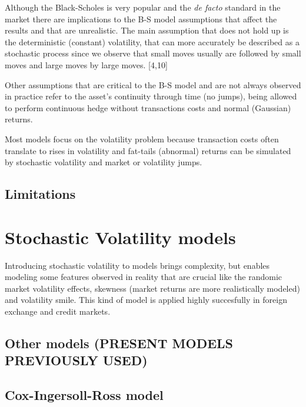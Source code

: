\documentclass[12pt,twoside]{reedthesis}
\theoremstyle{definition}
\theoremstyle{definition}
\theoremstyle{remark}
\begin{document}
  Although the Black-Scholes is very popular and the \emph{de facto}
  standard in the market there are implications to the B-S model
  assumptions that affect the results and that are unrealistic. The main
  assumption that does not hold up is the deterministic (constant)
  volatility, that can more accurately be described as a stochastic
  process since we observe that small moves usually are followed by small
  moves and large moves by large moves. {[}4,10{]}
  
  Other assumptions that are critical to the B-S model and are not always
  observed in practice refer to the asset's continuity through time (no
  jumps), being allowed to perform continuous hedge without transactions
  costs and normal (Gaussian) returns.
  
  Most models focus on the volatility problem because transaction costs
  often translate to rises in volatility and fat-tails (abnormal) returns
  can be simulated by stochastic volatility and market or volatility
  jumps.
  
  \subsection{Limitations}\label{limitations}
  
  \section{Stochastic Volatility
  models}\label{stochastic-volatility-models}
  
  Introducing stochastic volatility to models brings complexity, but
  enables modeling some features observed in reality that are crucial like
  the randomic market volatility effects, skewness (market returns are
  more realistically modeled) and volatility smile. This kind of model is
  applied highly succesfully in foreign exchange and credit markets.
  
  \subsection{Other models (PRESENT MODELS PREVIOUSLY
  USED)}\label{other-models-present-models-previously-used}
  
  \subsection{Cox-Ingersoll-Ross model}\label{cox-ingersoll-ross-model}
  
\end{document}
